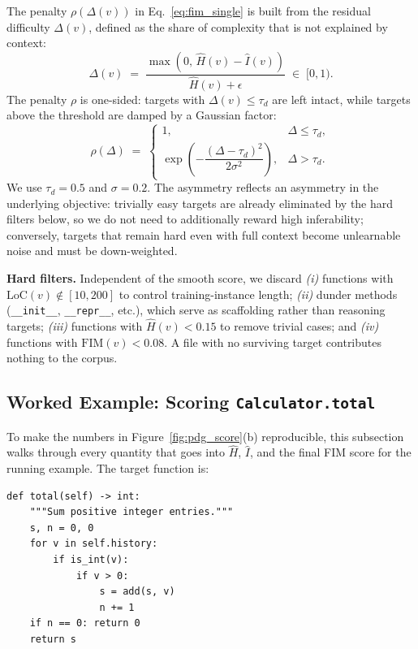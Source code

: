 The penalty $\rho(\Delta(v))$ in Eq.~\eqref{eq:fim_single} is built from
the residual difficulty $\Delta(v)$, defined as the share of complexity
that is not explained by context:
\begin{equation}
  \Delta(v) \;=\; \frac{\max\!\left(0,\,\hat{H}(v) - \hat{I}(v)\right)}{\hat{H}(v) + \epsilon}
  \;\in\; [0, 1).
  \label{eq:delta}
\end{equation}
The penalty $\rho$ is one-sided: targets with $\Delta(v) \le \tau_d$ are
left intact, while targets above the threshold are damped by a Gaussian
factor:
\begin{equation}
  \rho(\Delta) \;=\;
  \begin{cases}
    1, & \Delta \le \tau_d, \\[2pt]
    \exp\!\left(-\dfrac{(\Delta - \tau_d)^2}{2\sigma^2}\right), & \Delta > \tau_d.
  \end{cases}
  \label{eq:penalty}
\end{equation}
We use $\tau_d = 0.5$ and $\sigma = 0.2$. The asymmetry reflects an
asymmetry in the underlying objective: trivially easy targets are
already eliminated by the hard filters below, so we do not need to
additionally reward high inferability; conversely, targets that remain
hard even with full context become unlearnable noise and must be
down-weighted.

\textbf{Hard filters.}
Independent of the smooth score, we discard \emph{(i)} functions with
$\mathrm{LoC}(v) \notin [10, 200]$ to control training-instance length;
\emph{(ii)} dunder methods (\texttt{\_\_init\_\_},
\texttt{\_\_repr\_\_}, etc.), which serve as scaffolding rather than
reasoning targets; \emph{(iii)} functions with $\hat{H}(v) < 0.15$ to
remove trivial cases; and \emph{(iv)} functions with
$\mathrm{FIM}(v) < 0.08$. A file with no surviving target contributes
nothing to the corpus.

\subsection{Worked Example: Scoring \texttt{Calculator.total}}
\label{app:algo:worked_example}

To make the numbers in Figure~\ref{fig:pdg_score}(b) reproducible, this
subsection walks through every quantity that goes into $\hat{H}$,
$\hat{I}$, and the final FIM score for the running example. The target
function is:

\begin{center}\small
\begin{minipage}{0.78\linewidth}
\begin{verbatim}
def total(self) -> int:
    """Sum positive integer entries."""
    s, n = 0, 0
    for v in self.history:
        if is_int(v):
            if v > 0:
                s = add(s, v)
                n += 1
    if n == 0: return 0
    return s
\end{verbatim}
\end{minipage}
\end{center}

